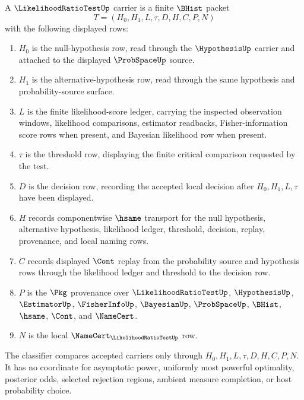 \begin{definition}\label{def:likelihood-ratio-test-carrier}
A $\LikelihoodRatioTestUp$ carrier is a finite $\BHist$ packet
$$
T=(H_0,H_1,L,\tau,D,H,C,P,N)
$$
with the following displayed rows:
\begin{enumerate}
\item $H_0$ is the null-hypothesis row, read through the $\HypothesisUp$ carrier and attached to the displayed $\ProbSpaceUp$ source.
\item $H_1$ is the alternative-hypothesis row, read through the same hypothesis and probability-source surface.
\item $L$ is the finite likelihood-score ledger, carrying the inspected observation windows, likelihood comparisons, estimator readbacks, Fisher-information score rows when present, and Bayesian likelihood row when present.
\item $\tau$ is the threshold row, displaying the finite critical comparison requested by the test.
\item $D$ is the decision row, recording the accepted local decision after $H_0,H_1,L,\tau$ have been displayed.
\item $H$ records componentwise $\hsame$ transport for the null hypothesis, alternative hypothesis, likelihood ledger, threshold, decision, replay, provenance, and local naming rows.
\item $C$ records displayed $\Cont$ replay from the probability source and hypothesis rows through the likelihood ledger and threshold to the decision row.
\item $P$ is the $\Pkg$ provenance over $\LikelihoodRatioTestUp$, $\HypothesisUp$, $\EstimatorUp$, $\FisherInfoUp$, $\BayesianUp$, $\ProbSpaceUp$, $\BHist$, $\hsame$, $\Cont$, and $\NameCert$.
\item $N$ is the local $\NameCert_{\LikelihoodRatioTestUp}$ row.
\end{enumerate}
The classifier compares accepted carriers only through $H_0,H_1,L,\tau,D,H,C,P,N$. It has no coordinate for asymptotic power, uniformly most powerful optimality, posterior odds, selected rejection regions, ambient measure completion, or host probability choice.
\end{definition}

